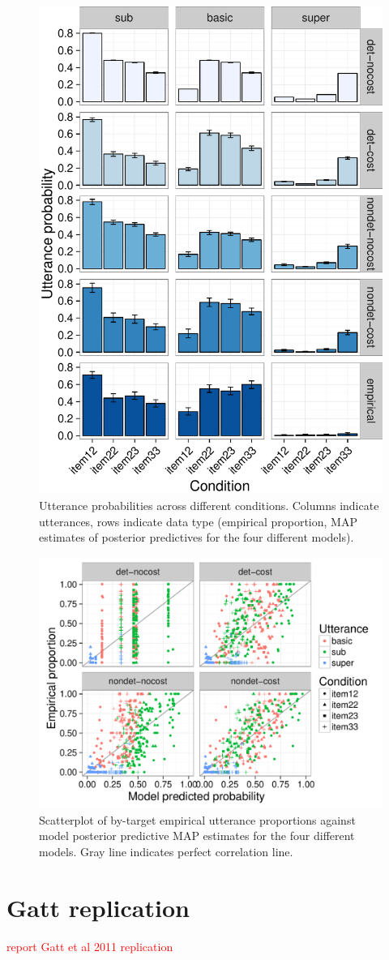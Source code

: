 \documentclass[11pt]{article}
\newcommand{\red}[1]{\textcolor{Red}{#1}}
\begin{document}
\begin{figure}
\centering
\includegraphics[width=.7\textwidth]{pics/qualitativepattern-complete}
\caption{Utterance probabilities across different conditions. Columns indicate utterances, rows indicate data type (empirical proportion, MAP estimates of posterior predictives for the four different models).}
\label{fig:nominalmodelqual}
\end{figure}

\begin{figure}
\centering
\includegraphics[width=.8\textwidth]{pics/scatterplot-complete}
\caption{Scatterplot of by-target empirical utterance proportions against model posterior predictive MAP estimates for the four different models. Gray line indicates perfect correlation line.}
\label{fig:nominalmodelscatt}
\end{figure}

\section{Gatt replication}
\red{report Gatt et al 2011 replication}



\setlength{\bibleftmargin}{.125in}
\setlength{\bibindent}{-\bibleftmargin}


\end{document}
